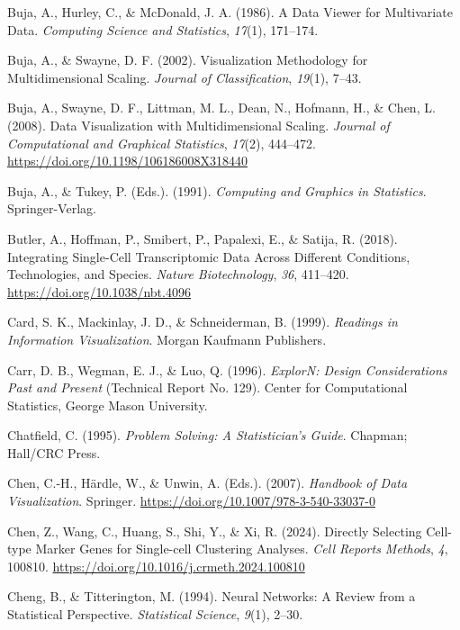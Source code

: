 \documentclass[
  letterpaper,
]{krantz}
\newlength{\cslhangindent}
\newenvironment{CSLReferences}[2] %
 {\begin{list}{}{%
  \setlength{\itemindent}{0pt}
  \setlength{\leftmargin}{0pt}
  \setlength{\parsep}{0pt}
  \ifodd #1
   \setlength{\leftmargin}{\cslhangindent}
   \setlength{\itemindent}{-1\cslhangindent}
  \fi
  \setlength{\itemsep}{#2\baselineskip}}}
 {\end{list}}
\begin{document}
\begin{CSLReferences}{1}{0}
Buja, A., Hurley, C., \& McDonald, J. A. (1986). A {D}ata {V}iewer for
{M}ultivariate {D}ata. \emph{Computing Science and Statistics},
\emph{17}(1), 171--174.

Buja, A., \& Swayne, D. F. (2002). Visualization {M}ethodology for
{M}ultidimensional {S}caling. \emph{Journal of Classification},
\emph{19}(1), 7--43.

Buja, A., Swayne, D. F., Littman, M. L., Dean, N., Hofmann, H., \& Chen,
L. (2008). Data {V}isualization with {M}ultidimensional {S}caling.
\emph{Journal of Computational and Graphical Statistics}, \emph{17}(2),
444--472. \url{https://doi.org/10.1198/106186008X318440}

Buja, A., \& Tukey, P. (Eds.). (1991). \emph{Computing and {G}raphics in
{S}tatistics}. Springer-Verlag.

Butler, A., Hoffman, P., Smibert, P., Papalexi, E., \& Satija, R.
(2018). Integrating {S}ingle-{C}ell {T}ranscriptomic {D}ata {A}cross
{D}ifferent {C}onditions, {T}echnologies, and {S}pecies. \emph{Nature
Biotechnology}, \emph{36}, 411--420.
\url{https://doi.org/10.1038/nbt.4096}

Card, S. K., Mackinlay, J. D., \& Schneiderman, B. (1999).
\emph{Readings in {I}nformation {V}isualization}. Morgan Kaufmann
Publishers.

Carr, D. B., Wegman, E. J., \& Luo, Q. (1996). \emph{Explor{N}: {D}esign
{C}onsiderations {P}ast and {P}resent} (Technical Report No. 129).
Center for Computational Statistics, George Mason University.

Chatfield, C. (1995). \emph{Problem {S}olving: {A} {S}tatistician's
{G}uide}. Chapman; Hall/CRC Press.

Chen, C.-H., Härdle, W., \& Unwin, A. (Eds.). (2007). \emph{Handbook of
{D}ata {V}isualization}. Springer.
\url{https://doi.org/10.1007/978-3-540-33037-0}

Chen, Z., Wang, C., Huang, S., Shi, Y., \& Xi, R. (2024). Directly
{S}electing {C}ell-type {M}arker {G}enes for {S}ingle-cell {C}lustering
{A}nalyses. \emph{Cell Reports Methods}, \emph{4}, 100810.
\url{https://doi.org/10.1016/j.crmeth.2024.100810}

Cheng, B., \& Titterington, M. (1994). Neural {N}etworks: {A} {R}eview
from a {S}tatistical {P}erspective. \emph{Statistical Science},
\emph{9}(1), 2--30.


\end{CSLReferences}
\end{document}
